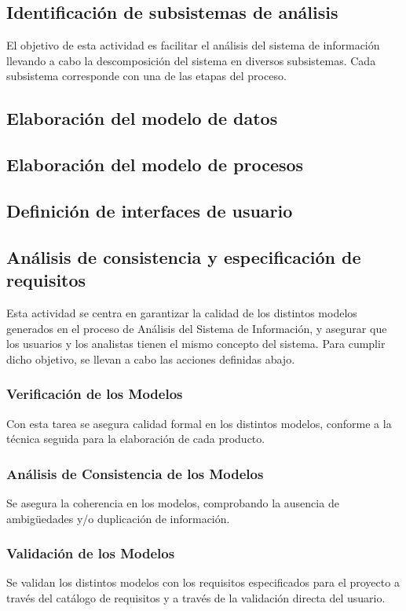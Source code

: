 \documentclass[11pt,a4paper,spanish,twoside]{report}
\begin{document}
\subsection{Identificación de subsistemas de análisis}
El objetivo de esta actividad es facilitar el análisis del sistema de
información llevando a cabo la descomposición del sistema en diversos
subsistemas. 
Cada subsistema corresponde con una de las etapas del proceso.
\subsection{Elaboración del modelo de datos}
\subsection{Elaboración del modelo de procesos}
\subsection{Definición de interfaces de usuario}
\subsection{Análisis de consistencia y especificación de requisitos}
Esta actividad se centra en garantizar la calidad de los distintos modelos
generados en el proceso de Análisis del Sistema de Información, y asegurar
que los usuarios y los analistas tienen el mismo concepto del sistema. Para
cumplir dicho objetivo, se llevan a cabo las acciones definidas abajo.  

\subsubsection{Verificación de los Modelos}
Con esta tarea se asegura calidad formal en los distintos modelos, conforme a 
la técnica seguida para la elaboración de cada producto.

\subsubsection{Análisis de Consistencia de los Modelos}
Se asegura la coherencia en los modelos, comprobando la ausencia de
ambigüedades y/o duplicación de información. 

\subsubsection{Validación de los Modelos}
Se validan los distintos modelos con los requisitos especificados para el
proyecto a través del catálogo de requisitos y a través de la validación
directa del usuario. 
\end{document}
